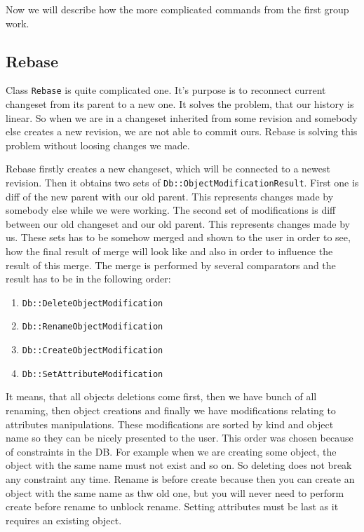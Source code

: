 \documentclass[deska]{subfiles}
\begin{document}
Now we will describe how the more complicated commands from the first group work.

\subsection{Rebase}

Class {\tt Rebase} is quite complicated one. It's purpose is to reconnect current changeset from its parent to a new
one. It solves the problem, that our history is linear. So when we are in a changeset inherited from some revision and
somebody else creates a new revision, we are not able to commit ours. Rebase is solving this problem without loosing
changes we made.

Rebase firstly creates a new changeset, which will be connected to a newest revision. Then it obtains two sets of
{\tt Db::ObjectModificationResult}. First one is diff of the new parent with our old parent. This represents changes
made by somebody else while we were working. The second set of modifications is diff between our old changeset and
our old parent. This represents changes made by us. These sets has to be somehow merged and shown to the user in order
to see, how the final result of merge will look like and also in order to influence the result of this merge.
The merge is performed by several comparators and the result has to be in the following order:
\begin{enumerate}
    \item {\tt Db::DeleteObjectModification}
    \item {\tt Db::RenameObjectModification}
    \item {\tt Db::CreateObjectModification}
    \item {\tt Db::SetAttributeModification}
\end{enumerate}
It means, that all objects deletions come first, then we have bunch of all renaming, then object creations and finally
we have modifications relating to attributes manipulations. These modifications are sorted by kind and object name so
they can be nicely presented to the user. This order was chosen because of constraints in the DB. For example when
we are creating some object, the object with the same name must not exist and so on. So deleting does not break any
constraint any time. Rename is before create because then you can create an object with the same name as thw old one,
but you will never need to perform create before rename to unblock rename. Setting attributes must be last as it
requires an existing object.
\end{document}
